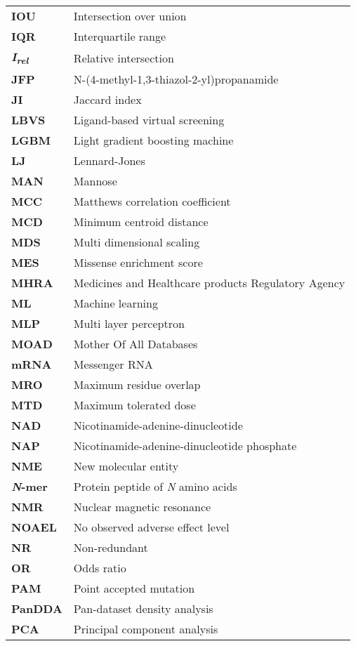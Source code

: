 \begin{longtable}[l]{@{}p{2.5cm}p{12cm}@{}}
\textbf{IOU} & Intersection over union \\
\textbf{IQR} & Interquartile range \\
\textbf{\textit{I\textsubscript{rel}}} & Relative intersection \\
\textbf{JFP} & N-(4-methyl-1,3-thiazol-2-yl)propanamide \\
\textbf{JI} & Jaccard index \\
\textbf{LBVS} & Ligand-based virtual screening \\
\textbf{LGBM} & Light gradient boosting machine \\
\textbf{LJ} & Lennard-Jones \\
\textbf{MAN} & Mannose \\
\textbf{MCC} & Matthews correlation coefficient \\
\textbf{MCD} & Minimum centroid distance \\
\textbf{MDS} & Multi dimensional scaling \\
\textbf{MES} & Missense enrichment score \\
\textbf{MHRA} & Medicines and Healthcare products Regulatory Agency \\
\textbf{ML} & Machine learning \\
\textbf{MLP} & Multi layer perceptron \\
\textbf{MOAD} & Mother Of All Databases \\
\textbf{mRNA} & Messenger RNA \\
\textbf{MRO} & Maximum residue overlap \\
\textbf{MTD} & Maximum tolerated dose \\
\textbf{NAD} & Nicotinamide-adenine-dinucleotide \\
\textbf{NAP} & Nicotinamide-adenine-dinucleotide phosphate \\
\textbf{NME} & New molecular entity \\
\textbf{\textit{N}-mer} & Protein peptide of \textit{N} amino acids \\
\textbf{NMR} & Nuclear magnetic resonance \\
\textbf{NOAEL} & No observed adverse effect level \\
\textbf{NR} & Non-redundant \\
\textbf{OR} & Odds ratio \\
\textbf{PAM} & Point accepted mutation \\
\textbf{PanDDA} & Pan-dataset density analysis \\
\textbf{PCA} & Principal component analysis \\

\end{longtable}
